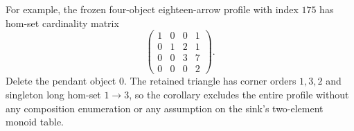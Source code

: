 For example, the frozen four-object eighteen-arrow profile
with index $175$ has hom-set cardinality matrix
\[
 \begin{pmatrix}
 1&0&0&1\\
 0&1&2&1\\
 0&0&3&7\\
 0&0&0&2
 \end{pmatrix}.
\]
Delete the pendant object $0$. The retained triangle has
corner orders $1,3,2$ and singleton long hom-set $1\to3$,
so the corollary excludes the entire profile without any
composition enumeration or any assumption on the sink's
two-element monoid table.
